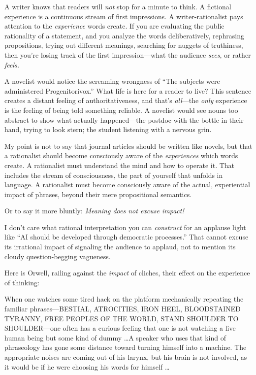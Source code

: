 {
 A writer knows that readers will \textit{not} stop for a minute to
think. A fictional experience is a continuous stream of first
impressions. A writer-rationalist pays attention to the
\textit{experience} words create. If you are evaluating the public
rationality of a statement, and you analyze the words deliberatively,
rephrasing propositions, trying out different meanings, searching for
nuggets of truthiness, then you're losing track of the
first impression---what the audience \textit{sees}, or rather
\textit{feels.}}

{
 A novelist would notice the screaming wrongness of
``The subjects were administered
Progenitorivox.'' What life is here for a reader to
live? This sentence creates a distant feeling of authoritativeness, and
that's \textit{all}{}---the \textit{only} experience is
the feeling of being told something reliable. A novelist would see
nouns too abstract to show what actually happened---the postdoc with
the bottle in their hand, trying to look stern; the student listening
with a nervous grin.}

{
 My point is not to say that journal articles should be written
like novels, but that a rationalist should become consciously aware of
the \textit{experiences} which words create. A rationalist must
understand the mind and how to operate it. That includes the stream of
consciousness, the part of yourself that unfolds in language. A
rationalist must become consciously aware of the actual, experiential
impact of phrases, beyond their mere propositional semantics.}

{
 Or to say it more bluntly: \textit{Meaning does not excuse
impact!}}

{
 I don't care what rational interpretation you can
\textit{construct} for an applause light like ``AI
should be developed through democratic processes.''
That cannot excuse its irrational impact of signaling the audience to
applaud, not to mention its cloudy question-begging vagueness.}

{
 Here is Orwell, railing against the \textit{impact} of cliches,
their effect on the experience of thinking:}

{
 When one watches some tired hack on the platform mechanically
repeating the familiar phrases---BESTIAL, ATROCITIES, IRON HEEL,
BLOODSTAINED TYRANNY, FREE PEOPLES OF THE WORLD, STAND SHOULDER TO
SHOULDER---one often has a curious feeling that one is not watching a
live human being but some kind of dummy \ldots A speaker who uses that
kind of phraseology has gone some distance toward turning himself into
a machine. The appropriate noises are coming out of his larynx, but his
brain is not involved, as it would be if he were choosing his words for
himself \ldots}

